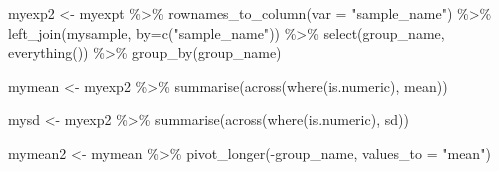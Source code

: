 \documentclass[
]{book}
\newenvironment{Shaded}{\begin{snugshade}}{\end{snugshade}}
\newcommand{\AttributeTok}[1]{\textcolor[rgb]{0.77,0.63,0.00}{#1}}
\newcommand{\FunctionTok}[1]{\textcolor[rgb]{0.00,0.00,0.00}{#1}}
\newcommand{\NormalTok}[1]{#1}
\newcommand{\OtherTok}[1]{\textcolor[rgb]{0.56,0.35,0.01}{#1}}
\newcommand{\SpecialCharTok}[1]{\textcolor[rgb]{0.00,0.00,0.00}{#1}}
\newcommand{\StringTok}[1]{\textcolor[rgb]{0.31,0.60,0.02}{#1}}
\begin{document}
\begin{Shaded}
\begin{Highlighting}[]
\NormalTok{myexp2 }\OtherTok{\textless{}{-}}\NormalTok{ myexpt }\SpecialCharTok{\%\textgreater{}\%} 
  \FunctionTok{rownames\_to\_column}\NormalTok{(}\AttributeTok{var =} \StringTok{"sample\_name"}\NormalTok{) }\SpecialCharTok{\%\textgreater{}\%} 
  \FunctionTok{left\_join}\NormalTok{(mysample, }\AttributeTok{by=}\FunctionTok{c}\NormalTok{(}\StringTok{"sample\_name"}\NormalTok{)) }\SpecialCharTok{\%\textgreater{}\%} 
  \FunctionTok{select}\NormalTok{(group\_name, }\FunctionTok{everything}\NormalTok{()) }\SpecialCharTok{\%\textgreater{}\%} 
  \FunctionTok{group\_by}\NormalTok{(group\_name)}

\NormalTok{mymean }\OtherTok{\textless{}{-}}\NormalTok{ myexp2 }\SpecialCharTok{\%\textgreater{}\%} 
  \FunctionTok{summarise}\NormalTok{(}\FunctionTok{across}\NormalTok{(}\FunctionTok{where}\NormalTok{(is.numeric), mean))}

\NormalTok{mysd }\OtherTok{\textless{}{-}}\NormalTok{ myexp2 }\SpecialCharTok{\%\textgreater{}\%} 
  \FunctionTok{summarise}\NormalTok{(}\FunctionTok{across}\NormalTok{(}\FunctionTok{where}\NormalTok{(is.numeric), sd))}

\NormalTok{mymean2 }\OtherTok{\textless{}{-}}\NormalTok{ mymean }\SpecialCharTok{\%\textgreater{}\%} 
  \FunctionTok{pivot\_longer}\NormalTok{(}\SpecialCharTok{{-}}\NormalTok{group\_name, }\AttributeTok{values\_to =} \StringTok{"mean"}\NormalTok{)}
\end{Highlighting}
\end{Shaded}
\end{document}
